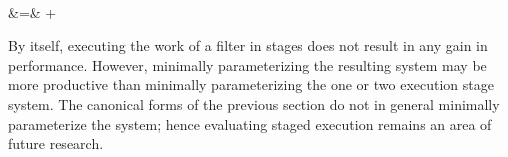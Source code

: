 ~~~
\begin{minipage}{2in}
\vspace{-15pt}
\starteqnstar
{} &\hspace{-6pt}=\hspace{-6pt}& 
 +  
\doneeqnstar
\end{minipage}

By itself, executing the work of a filter in stages does not result in
any gain in performance. However, minimally parameterizing the
resulting system may be more productive than minimally parameterizing
the one or two execution stage system.  The canonical forms of the
previous section do not in general minimally parameterize the system;
hence evaluating staged execution remains an area of future research.
